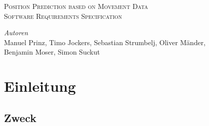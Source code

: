 \documentclass[12pt]{article} %
\begin{document}


\begin{titlepage}

\newcommand{\HRule}{\rule{\linewidth}{0.5mm}} %

\center %

\textsc{\Large Position Prediction based on Movement Data}\\[0.5cm] %
\textsc{\large Software Requirements Specification}\\[0.5cm] %

\vfill

\emph{Autoren}\\
Manuel Prinz, Timo Jockers, Sebastian Strumbelj, Oliver Mänder, \\Benjamin Moser, Simon Suckut

\vfill %

\end{titlepage}


\tableofcontents %

\newpage %


\section{Einleitung}


\subsection{Zweck}
\end{document}
